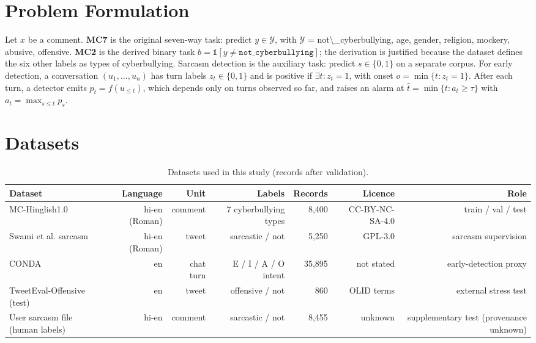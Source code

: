 \documentclass[10pt,twocolumn]{article}
\begin{document}
\section{Problem Formulation}

Let $x$ be a comment. \textbf{MC7} is the original seven-way task: predict $y \in \mathcal{Y}$, with $\mathcal{Y}$ =
{not\textbackslash{}\_cyberbullying, age, gender, religion, mockery, abusive, offensive}. \textbf{MC2} is the derived binary task
$b=\mathbb{1}[y\neq\texttt{not\_cyberbullying}]$; the derivation is justified because the dataset defines the six
other labels as types of cyberbullying. Sarcasm detection is the auxiliary task: predict $s\in\{0,1\}$ on a separate
corpus. For early detection, a conversation $(u_1,\dots,u_n)$ has turn labels $z_t\in\{0,1\}$ and is positive if
$\exists t: z_t=1$, with onset $o=\min\{t: z_t=1\}$. After each turn, a detector emits $p_t=f(u_{\le t})$, which
depends only on turns observed so far, and raises an alarm at $\hat t=\min\{t: a_t\ge\tau\}$ with
$a_t=\max_{s\le t}p_s$.

\section{Datasets}

\begin{table}[t]
\centering
\small
\caption{Datasets used in this study (records after validation).}
\label{tab:datasets}
\begin{adjustbox}{max width=\textwidth}\begin{tabular}{lrrrrrr}
\toprule
Dataset & Language & Unit & Labels & Records & Licence & Role \\
\midrule
MC-Hinglish1.0 & hi-en (Roman) & comment & 7 cyberbullying types & 8,400 & CC-BY-NC-SA-4.0 & train / val / test \\
Swami et al. sarcasm & hi-en (Roman) & tweet & sarcastic / not & 5,250 & GPL-3.0 & sarcasm supervision \\
CONDA & en & chat turn & E / I / A / O intent & 35,895 & not stated & early-detection proxy \\
TweetEval-Offensive (test) & en & tweet & offensive / not & 860 & OLID terms & external stress test \\
User sarcasm file (human labels) & hi-en & comment & sarcastic / not & 8,455 & unknown & supplementary test (provenance unknown) \\
\bottomrule
\end{tabular}\end{adjustbox}
\end{table}
\end{document}
